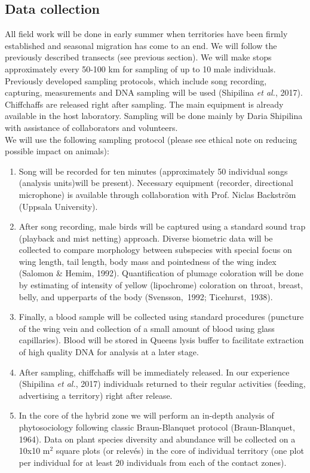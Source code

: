 \documentclass[11pt,a4paper]{article}
\begin{document}
\subsection{Data collection}
All field work will be done in early summer when territories have been firmly established and seasonal migration has come to an end. We will follow the previously described transects (see previous section). We will make stops approximately every 50-100 km for sampling of up to 10 male individuals. Previously developed sampling protocols, which include song recording, capturing, measurements and DNA sampling will be used (Shipilina \textit{et al.}, 2017). Chiffchaffs are released right after sampling. The main equipment is already available in the host laboratory. Sampling will be done mainly by Daria Shipilina with assistance of collaborators and volunteers.\\
We will use the following sampling protocol (please see ethical note on reducing possible impact on animals):
\begin{enumerate} 
\item Song will be recorded for ten minutes (approximately 50 individual songs (analysis units)will be present). Necessary equipment (recorder, directional microphone) is available through collaboration with Prof. Niclas Backström (Uppsala University). 
\item After song recording, male birds will be captured using a standard sound trap (playback and mist netting) approach. Diverse biometric data will be collected to compare morphology between subspecies with special focus on wing length, tail length, body mass and pointedness of the wing index (Salomon \& Hemim, 1992). Quantification of plumage coloration will be done by estimating of intensity of yellow (lipochrome) coloration on throat, breast, belly, and upperparts of the body (Svensson, 1992; Ticehurst, 1938). 
\item Finally, a blood sample will be collected using standard procedures (puncture of the wing vein and collection of a small amount of blood using glass capillaries). Blood will be stored in Queens lysis buffer to facilitate extraction of high quality DNA for analysis at a later stage. 
\item After sampling, chiffchaffs will be immediately released. In our experience (Shipilina \textit{et al.}, 2017) individuals returned to their regular activities (feeding, advertising a territory) right after release. 
\item In the core of the hybrid zone we will perform an in-depth analysis of phytosociology following classic Braun-Blanquet protocol (Braun-Blanquet, 1964). Data on plant species diversity and abundance will be collected on a 10x10 m$^2$ square plots (or relevés) in the core of individual territory (one plot per individual for at least 20 individuals from each of the contact zones). 
\end{enumerate}
\end{document}

